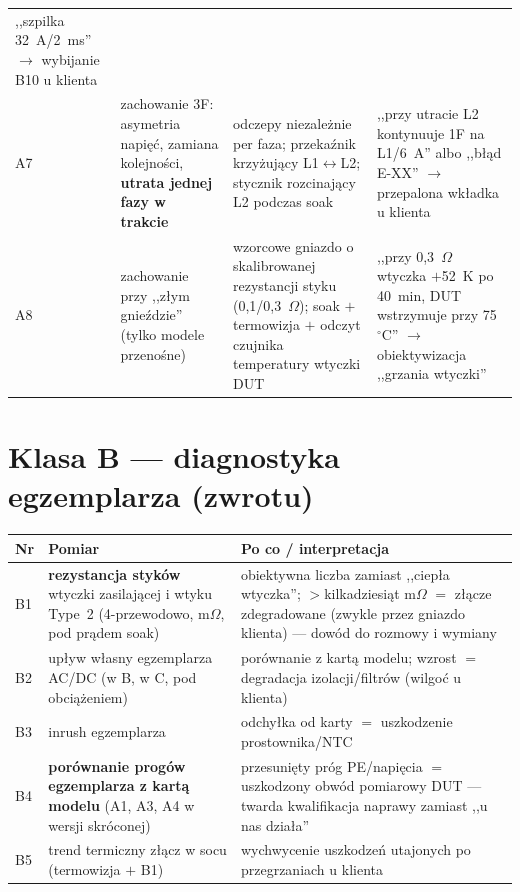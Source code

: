 \documentclass[11pt,a4paper]{article}
\newcommand{\ohm}{$\Omega$}
\begin{document}
\begin{longtable}{@{}p{}p{}p{}p{}@{}}
,,szpilka 32~A/2~ms'' $\to$ wybijanie B10 u klienta\\
A7 & zachowanie 3F: asymetria napięć, zamiana kolejności, \textbf{utrata jednej fazy w trakcie} &
odczepy niezależnie per faza; przekaźnik krzyżujący L1$\leftrightarrow$L2; stycznik rozcinający
L2 podczas soak & ,,przy utracie L2 kontynuuje 1F na L1/6~A'' albo ,,błąd E-XX''
$\to$ przepalona wkładka u klienta\\
A8 & zachowanie przy ,,złym gnieździe'' (tylko modele przenośne) & wzorcowe gniazdo o
skalibrowanej rezystancji styku (0,1/0,3~\ohm); soak $+$ termowizja $+$ odczyt czujnika
temperatury wtyczki DUT & ,,przy 0,3~\ohm{} wtyczka $+$52~K po 40~min, DUT wstrzymuje przy
75~$^\circ$C'' $\to$ obiektywizacja ,,grzania wtyczki''\\
\bottomrule
\end{longtable}

\section{Klasa B --- diagnostyka egzemplarza (zwrotu)}
\begin{longtable}{@{}p{}p{}p{}@{}}
\toprule
\textbf{Nr} & \textbf{Pomiar} & \textbf{Po co / interpretacja}\\
\midrule
B1 & \textbf{rezystancja styków} wtyczki zasilającej i wtyku Type~2 (4-przewodowo, m\ohm,
pod prądem soak) & obiektywna liczba zamiast ,,ciepła wtyczka''; $>$kilkadziesiąt m\ohm{} $=$
złącze zdegradowane (zwykle przez gniazdo klienta) --- dowód do rozmowy i wymiany\\
B2 & upływ własny egzemplarza AC/DC (w B, w C, pod obciążeniem) & porównanie z kartą modelu;
wzrost $=$ degradacja izolacji/filtrów (wilgoć u klienta)\\
B3 & inrush egzemplarza & odchyłka od karty $=$ uszkodzenie prostownika/NTC\\
B4 & \textbf{porównanie progów egzemplarza z kartą modelu} (A1, A3, A4 w wersji skróconej) &
przesunięty próg PE/napięcia $=$ uszkodzony obwód pomiarowy DUT --- twarda kwalifikacja
naprawy zamiast ,,u nas działa''\\
B5 & trend termiczny złącz w socu (termowizja $+$ B1) & wychwycenie uszkodzeń utajonych po
przegrzaniach u klienta\\
\bottomrule
\end{longtable}
\end{document}
